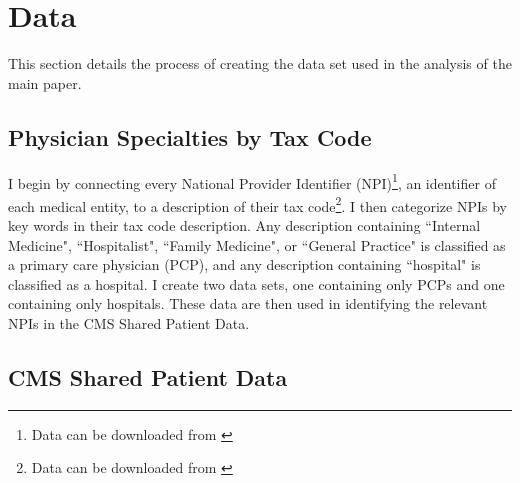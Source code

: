 \documentclass[12pt]{article}
\begin{document}
\clearpage
\onehalfspacing

\printbibliography

\clearpage


\appendix

\section{Data}\label{app:data}

This section details the process of creating the data set used in the analysis of the main paper. 

\subsection{Physician Specialties by Tax Code}\label{sec:taxcode}

I begin by connecting every National Provider Identifier (NPI)\footnote{Data can be downloaded from \hyperlink{https://download.cms.gov/nppes/NPI/Files.html}{}}, an identifier of each medical entity, to a description of their tax code\footnote{Data can be downloaded from \hyperlink{https://nucc.org/index.php/code-sets-mainmenu-41/provider-taxonomy-mainmenu-40/pdf-mainmenu-53}{}}. I then categorize NPIs by key words in their tax code description. Any description containing ``Internal Medicine", ``Hospitalist", ``Family Medicine", or ``General Practice" is classified as a primary care physician (PCP), and any description containing ``hospital" is classified as a hospital. I create two data sets, one containing only PCPs and one containing only hospitals. These data are then used in identifying the relevant NPIs in the CMS Shared Patient Data. 



\subsection{CMS Shared Patient Data}\label{sec:sharedpat}
\end{document}
